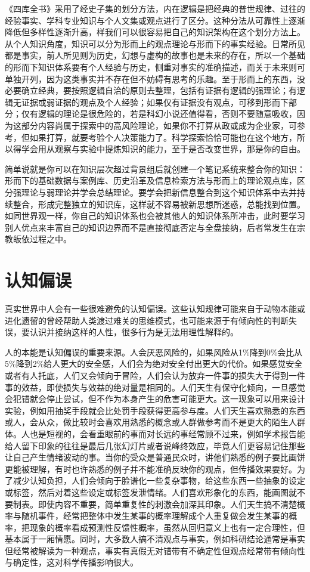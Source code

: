 \documentclass[]{tufte-book}
\begin{document}
《四库全书》采用了经史子集的划分方法，内在逻辑是把经典的普世规律、过往的经验事实、学科专业知识与个人文集或观点进行了区分。这种分法从可靠性上逐渐降低但多样性逐渐升高，样我们可以很容易把自己的知识架构在这个划分方法上。从个人知识角度，知识可以分为形而上的观点理论与形而下的事实经验。日常所见都是事实，前人所见则为历史，幻想与虚构的故事也是未来的存在，所以一个基础的形而下知识体系要有个人经验与历史，侧重对事实的准确描述，而关于未来则可单独开列，因为这类事实并不存在但不妨碍有思考的乐趣。至于形而上的东西，没必要确立经典，要按照逻辑自洽的原则去整理，包括有证据有逻辑的强理论；有逻辑无证据或弱证据的观点及个人经验；如果仅有证据没有观点，可移到形而下部分；仅有逻辑的理论是很危险的，若是科幻小说还值得看，否则不要随意吸收，因为这部分内容尚属于探索中的高风险理论，如果你不打算从政或成为企业家，可参考，但如果打算，就要考验个人决策能力了。科学探索恰恰可能也在这个地方，所以得学会用从观察与实验中提炼知识的能力，至于是否改变世界，那是你的自由。

简单说就是你可以在知识层次超过背景组后就创建一个笔记系统来整合你的知识：形而下的基础数据与案例库、历史沿革及信息检索方法与形而上的理论观点库，区分强理论与弱理论并学会总结理论。要学会把新信息整合到这个知识体系中去并持续整合，形成完整独立的知识库，这样就不容易被新思想所迷惑，总能找到位置。如同世界观一样，你自己的知识体系也会被其他人的知识体系所冲击，此时要学习别人优点来丰富自己的知识边界而不是直接彻底否定与全盘接纳，后者常发生在宗教皈依过程之中。

\hypertarget{ux8ba4ux77e5ux504fux8bef}{%
\section{认知偏误}\label{ux8ba4ux77e5ux504fux8bef}}

真实世界中人会有一些很难避免的认知偏误。这些认知规律可能来自于动物本能或进化遗留的曾经帮助人类渡过难关的思维模式，也可能来源于有倾向性的判断失误，要认识并接纳这样的人性，很多行为是无法用理性解释的。

人的本能是认知偏误的重要来源。人会厌恶风险的，如果风险从1\%降到0\%会比从5\%降到2\%给人更大的安全感，人们会为绝对安全付出更大的代价。如果感觉安全或者有人托底，人们又会倾向于冒险，人们会认为放弃一件事的损失大于得到一件事的效益，即使损失与效益的绝对量是相同的。人们天生有保守化倾向，一旦感觉会犯错就会停止尝试，但不作为本身产生的危害可能更大。这一现象可以用来设计实验，例如用抽奖手段就会比处罚手段获得更高参与度。人们天生喜欢熟悉的东西或人，会从众，做比较时会喜欢用熟悉的概念或人群做参考而不是更大的陌生人群体。人也是短视的，会看重眼前的事而对长远的事经常顾不过来，例如学术报告能给人留下印象的往往是最后几张幻灯片或者说峰终效应，毕竟人们更容易记住那些让自己产生情绪波动的事。当你的受众是普通民众时，讲他们熟悉的例子要比画饼更能被理解，有时也许熟悉的例子并不能准确反映你的观点，但传播效果要好。为了减少认知负担，人们会倾向于脸谱化一些复杂事物，给这些东西一些抽象的设定或标签，然后对着这些设定或标签发泄情绪。人们喜欢形象化的东西，能画图就不要制表。即使内容不重要，简单重复性的刺激会加深其印象。人们天生搞不清楚概率与随机事件，经常把整体中发生某事的概率理解成个人重复做会发生某事的概率，把现象的概率看成预测性反馈性概率，虽然从回归意义上也有一定合理性，但基本属于一厢情愿。同时，大多数人搞不清观点与事实，例如科研结论通常是事实但经常被解读为一种观点，事实有真假无对错带有不确定性但观点经常带有倾向性与确定性，这对科学传播影响很大。
\end{document}
